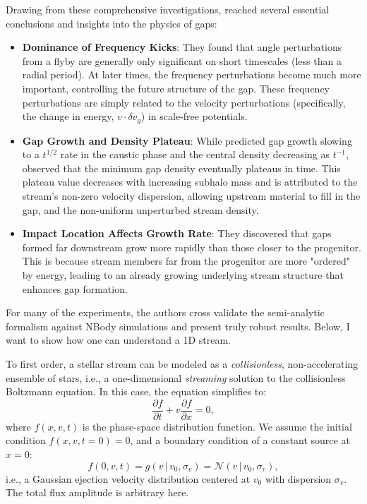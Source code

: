            Drawing from these comprehensive investigations, \citet{2016MNRAS.457.3817S} reached several essential conclusions and insights into the physics of gaps:
            \begin{itemize}
                \item \textbf{Dominance of Frequency Kicks}: They found that angle perturbations from a flyby are generally only significant on short timescales (less than a radial period). At later times, the frequency perturbations become much more important, controlling the future structure of the gap. These frequency perturbations are simply related to the velocity perturbations (specifically, the change in energy, $v \cdot \delta v_g$) in scale-free potentials.
                \item \textbf{Gap Growth and Density Plateau}: While \citet{2015MNRAS.450.1136E} predicted gap growth slowing to a $t^{1/2}$ rate in the caustic phase and the central density decreasing as $t^{-1}$, \citet{2016MNRAS.457.3817S} observed that the minimum gap density eventually plateaus in time. This plateau value decreases with increasing subhalo mass and is attributed to the stream's non-zero velocity dispersion, allowing upstream material to fill in the gap, and the non-uniform unperturbed stream density.
                \item \textbf{Impact Location Affects Growth Rate}: They discovered that gaps formed far downstream grow more rapidly than those closer to the progenitor. This is because stream members far from the progenitor are more "ordered" by energy, leading to an already growing underlying stream structure that enhances gap formation.
            \end{itemize}
            For many of the experiments, the authors cross validate the semi-analytic formalism against NBody simulations and present truly robust results. Below, I want to show how one can understand a 1D stream. 

            To first order, a stellar stream can be modeled as a \textit{collisionless}, non-accelerating ensemble of stars, i.e., a one-dimensional \textit{streaming} solution to the collisionless Boltzmann equation. In this case, the equation simplifies to:
            \begin{equation}
                \frac{\partial f}{\partial t} + v \frac{\partial f}{\partial x} = 0,
            \end{equation}
            where \( f(x,v,t) \) is the phase-space distribution function. We assume the initial condition \( f(x,v,t=0) = 0 \), and a boundary condition of a constant source at \( x=0 \):
            \begin{equation}
                f(0,v,t) = g(v \,|\, v_0, \sigma_v) = \mathcal{N}(v \,|\, v_0, \sigma_v),
            \end{equation}
            i.e., a Gaussian ejection velocity distribution centered at \( v_0 \) with dispersion \( \sigma_v \). The total flux amplitude is arbitrary here.

